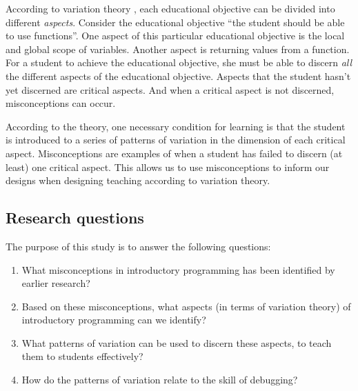 According to variation theory \parencite[Ch.~2]{NCOL}, each educational 
objective can be divided into different \emph{aspects}.
Consider the educational objective \enquote{the student should be able to use 
functions}.
One aspect of this particular educational objective is the local and global 
scope of variables.
Another aspect is returning values from a function.
For a student to achieve the educational objective, she must be able to discern 
\emph{all} the different aspects of the educational objective.
Aspects that the student hasn't yet discerned are critical aspects.
And when a critical aspect is not discerned, misconceptions can occur.

According to the theory, one necessary condition for learning is that the 
student is introduced to a series of patterns of variation in the dimension of 
each critical aspect.
Misconceptions are examples of when a student has failed to discern (at least) 
one critical aspect.
This allows us to use misconceptions to inform our designs when designing 
teaching according to variation theory.

\subsection{Research questions}

The purpose of this study is to answer the following questions:
\begin{frame}
\begin{enumerate}
  \item<1> What misconceptions in introductory programming has been identified 
    by earlier research?
  \item<2-3> Based on these misconceptions, what aspects (in terms of variation 
    theory) of introductory programming can we identify?
  \item<3> What patterns of variation can be used to discern these aspects, to 
    teach them to students effectively?
  \item<4> How do the patterns of variation relate to the skill of debugging?
\end{enumerate}
\end{frame}
